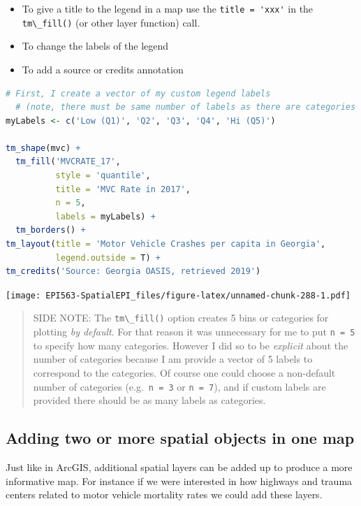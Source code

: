 \documentclass[
]{book}
\newcommand{\passthrough}[1]{#1}
\providecommand{\tightlist}{%
  \setlength{\itemsep}{0pt}\setlength{\parskip}{0pt}}
\begin{document}
\begin{itemize}
\tightlist
\item
  To give a title to the legend in a map use the \passthrough{\lstinline!title = 'xxx'!} in the \passthrough{\lstinline!tm\_fill()!} (or other layer function) call.
\item
  To change the labels of the legend
\item
  To add a source or credits annotation
\end{itemize}

\begin{lstlisting}[language=R]
  # First, I create a vector of my custom legend labels
  # (note, there must be same number of labels as there are categories in map)
myLabels <- c('Low (Q1)', 'Q2', 'Q3', 'Q4', 'Hi (Q5)')

tm_shape(mvc) +
  tm_fill('MVCRATE_17',
          style = 'quantile',
          title = 'MVC Rate in 2017',
          n = 5, 
          labels = myLabels) +
  tm_borders() +
tm_layout(title = 'Motor Vehicle Crashes per capita in Georgia',
          legend.outside = T) +
tm_credits('Source: Georgia OASIS, retrieved 2019')
\end{lstlisting}

\texttt{[image: EPI563-SpatialEPI\_files/figure-latex/unnamed-chunk-288-1.pdf]}

\begin{quote}
SIDE NOTE: The \passthrough{\lstinline!tm\_fill()!} option creates 5 bins or categories for plotting \emph{by default}. For that reason it was unnecessary for me to put \passthrough{\lstinline!n = 5!} to specify how many categories. However I did so to be \emph{explicit} about the number of categories because I am provide a vector of 5 labels to correspond to the categories. Of course one could choose a non-default number of categories (e.g.~\passthrough{\lstinline!n = 3!} or \passthrough{\lstinline!n = 7!}), and if custom labels are provided there should be as many labels as categories.
\end{quote}

\hypertarget{adding-two-or-more-spatial-objects-in-one-map}{%
\subsection{Adding two or more spatial objects in one map}\label{adding-two-or-more-spatial-objects-in-one-map}}

Just like in ArcGIS, additional spatial layers can be added up to produce a more informative map. For instance if we were interested in how highways and trauma centers related to motor vehicle mortality rates we could add these layers.
\end{document}
